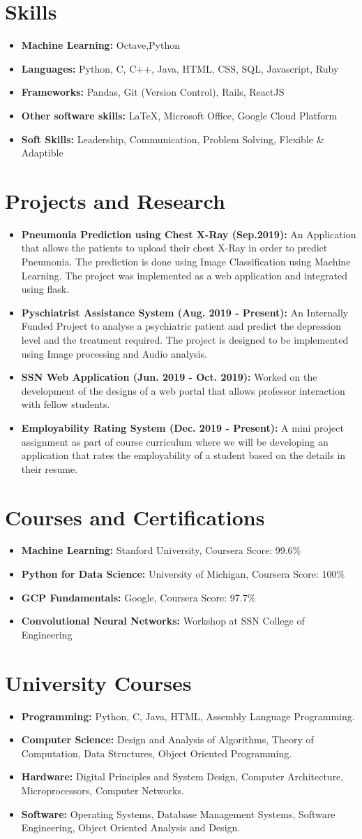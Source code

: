 \documentclass[letterpaper,12pt]{article}
\newcommand{\resumeItem}[2]{
\item\small{
\textbf{#1}{ #2 \vspace{-2pt}}
}
}
\newcommand{\resumeSubHeadingListStart}{\begin{itemize}[leftmargin=*]}
\newcommand{\resumeSubHeadingListEnd}{\end{itemize}}
\begin{document}
\section{Skills}
\resumeSubHeadingListStart
\resumeItem{Machine Learning:}{Octave,Python}
\resumeItem{Languages:}{Python, C, C++, Java, HTML, CSS, SQL, Javascript, Ruby}
\resumeItem{Frameworks:}{Pandas, Git (Version Control), Rails, ReactJS}
\resumeItem{Other software skills:}{LaTeX, Microsoft Office, Google Cloud Platform}
\resumeItem{Soft Skills:}{Leadership, Communication, Problem Solving, Flexible \& Adaptible} 
\resumeSubHeadingListEnd



\section{Projects and Research}
\resumeSubHeadingListStart
\resumeItem{Pneumonia Prediction using Chest X-Ray (Sep.2019):}{An Application that allows the patients to upload their chest X-Ray in order to predict Pneumonia. The prediction is done using Image Classification using Machine Learning. The project was implemented as a web application and integrated using flask. }
\resumeItem{Pyschiatrist Assistance System (Aug. 2019 - Present):}{An Internally Funded Project to analyse a psychiatric patient and predict the depression level and the treatment required. The project is designed to be implemented using Image processing and Audio analysis.}
\resumeItem{SSN Web Application (Jun. 2019 - Oct. 2019):}{Worked on the development of the designs of a web portal that allows professor interaction with fellow students.}
\resumeItem{Employability Rating System (Dec. 2019 - Present):}{A mini project assignment as part of course curriculum where we will be developing an application that rates the employability of a student based on the details in their resume.}
\resumeSubHeadingListEnd


\section{Courses and Certifications}
\resumeSubHeadingListStart
\resumeItem{Machine Learning:}{Stanford University, Coursera}{Score: 99.6\%}
\resumeItem{Python for Data Science:}{University of Michigan, Coursera}{Score: 100\%}
\resumeItem{GCP Fundamentals:}{Google, Coursera}{Score: 97.7\%}
\resumeItem{Convolutional Neural Networks:}{Workshop at SSN College of Engineering}
\resumeSubHeadingListEnd
\section{University Courses}
\resumeSubHeadingListStart
\resumeItem{Programming:}{Python, C, Java, HTML, Assembly Language Programming.}
\resumeItem{Computer Science:}{Design and Analysis of Algorithms, Theory of Computation,  Data Structures, Object Oriented Programming.}
\resumeItem{Hardware:}{Digital Principles and System Design, Computer Architecture, Microprocessors,  Computer Networks.}
\resumeItem{Software:}{Operating Systems, Database Management Systems, Software Engineering, Object Oriented Analysis and Design.}
\resumeSubHeadingListEnd
\end{document}
